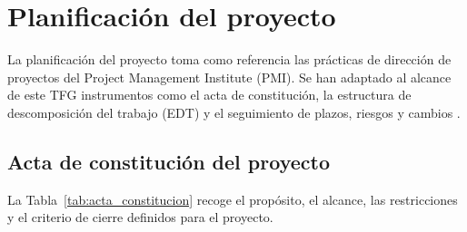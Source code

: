 \chapter{Planificación del proyecto}
\label{chap:planificacion}

La planificación del proyecto toma como referencia las prácticas de
dirección de proyectos del Project Management Institute (PMI). Se han
adaptado al alcance de este TFG instrumentos como el acta de constitución,
la estructura de descomposición del trabajo (EDT) y el seguimiento de
plazos, riesgos y cambios \cite{pmi2021pmbok}.

\section{Acta de constitución del proyecto}
\label{sec:acta_constitucion}

La Tabla~\ref{tab:acta_constitucion} recoge el propósito, el alcance,
las restricciones y el criterio de cierre definidos para el proyecto.


